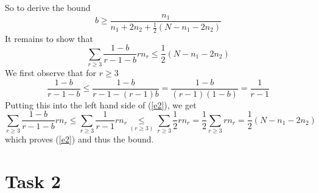 \documentclass[%
   11pt,              %
   ngerman,           %
   a4paper,           %
   DIV11,             %
]{scrartcl}%
\begin{document}
So to derive the bound
\begin{equation*}
	b \geq \frac{n_1}{n_1 + 2n_2 + \frac{1}{2}(N - n_1 - 2n_2)}
\end{equation*}
It remains to show that
\begin{equation}\label{e2}
	\sum_{r \geq 3}\frac{1-b}{r-1-b}rn_r \leq \frac{1}{2}(N - n_1 - 2n_2)
\end{equation}
We first observe that for $r\geq3$
\begin{equation*}
	\frac{1-b}{r-1-b} \leq \frac{1-b}{r-1-(r-1)b} = \frac{1-b}{(r-1)(1-b)} = \frac{1}{r-1}
\end{equation*}
Putting this into the left hand side of (\ref{e2}), we get
\begin{equation*}
	\sum_{r \geq 3}\frac{1-b}{r-1-b}rn_r \leq \sum_{r \geq 3}\frac{1}{r-1}rn_r \underset{(r \geq 3)}{\leq} \sum_{r \geq 3}\frac{1}{2}rn_r = \frac{1}{2}\sum_{r \geq 3}rn_r = \frac{1}{2}(N - n_1 - 2n_2)
\end{equation*}
which proves (\ref{e2}) and thus the bound.
\section*{Task 2}
\end{document}
